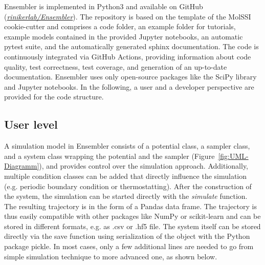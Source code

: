 

Ensembler is implemented in Python3\cite{VanRossum2009} and available on GitHub\cite{Github2020}  (\textit{\hyperlink{https://github.com/rinikerlab/Ensembler}{rinikerlab/Ensembler}}). 
The repository is based on the template of the MolSSI cookie-cutter\cite{Naden2018} and comprises a code folder, an example folder for tutorials, example models contained in the provided Jupyter notebooks,\cite{Kluyver2016} an automatic pytest suite,\cite{Krekel2004} and the automatically generated sphinx \cite{Brandl2008} documentation. 
The code is continuously integrated via GitHub Actions,\cite{githhubAction20} providing information about code quality, test correctness, test coverage, and generation of an up-to-date documentation. 
Ensembler uses only open-source packages like the SciPy library\cite{Virtanen2020, VanDerWalt2011, Meurer2017, Mckinney2010, Hunter2007} and Jupyter notebooks.\cite{Kluyver2016} 
In the following, a user and a developer perspective are provided for the code structure. 

\subsection{User level}
 A simulation model in Ensembler consists of a potential class, a sampler class, and a system class wrapping the potential and the sampler (Figure~\ref{fig:UML-Diagramm}), and provides control over the simulation approach. 
Additionally, multiple condition classes can be added that directly influence the simulation (e.g. periodic boundary condition\cite{Cheatham1995, Leach2001} or  thermostatting\cite{Andersen1980}). 
After the construction of the system, the simulation can be started directly with the \textit{simulate} function. 
The resulting trajectory is in the form of a Pandas data frame.\cite{Mckinney2010} The trajectory is thus easily compatible with other packages like NumPy\cite{VanDerWalt2011} or scikit-learn\cite{scikit-learn} and can be stored in different formats, e.g. as .csv or .hf5 file. The system itself can be stored directly via the save function using serialization of the object with the Python package pickle.
In most cases, only a few additional lines are needed to go from simple simulation technique to more advanced one, as shown below. 

